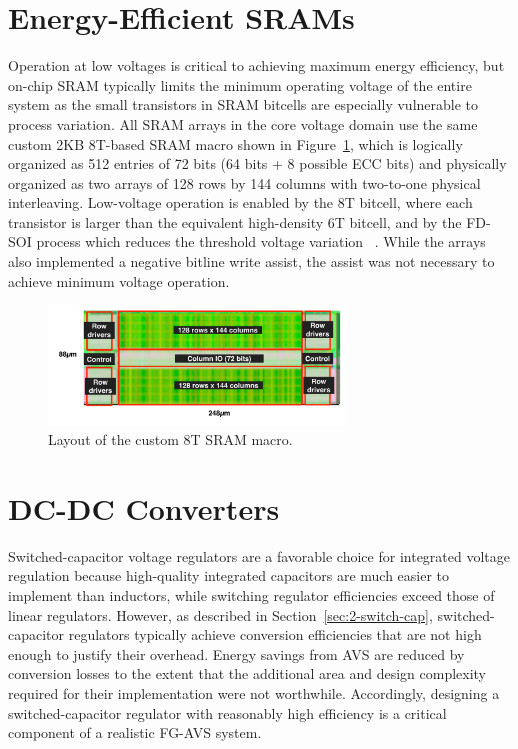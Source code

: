 \documentclass[graybox]{svmult}
\begin{document}
\section{Energy-Efficient SRAMs}

Operation at low voltages is critical to achieving maximum energy efficiency, but on-chip SRAM typically limits the minimum operating voltage of the entire system as the small transistors in SRAM bitcells are especially vulnerable to process variation.
All SRAM arrays in the core voltage domain use the same custom 2KB 8T-based SRAM macro shown in Figure~\ref{fig:sram}, which is logically organized as 512 entries of 72 bits (64 bits + 8 possible ECC bits) and physically organized as two arrays of 128 rows by 144 columns with two-to-one physical interleaving.
Low-voltage operation is enabled by the 8T bitcell, where each transistor is larger than the equivalent high-density 6T bitcell, and by the FD-SOI process which reduces the threshold voltage variation \cite{planes}~\cite{raven1}.
While the arrays also implemented a negative bitline write assist, the assist was not necessary to achieve minimum voltage operation.

\begin{figure}
  \centering
  \includegraphics[width=0.7\textwidth]{sram}
  \caption{Layout of the custom 8T SRAM macro.}
  \label{fig:sram}
\end{figure}


\section{DC-DC Converters}


Switched-capacitor voltage regulators are a favorable choice for integrated voltage regulation because high-quality integrated capacitors are much easier to implement than inductors, while switching regulator efficiencies exceed those of linear regulators.
However, as described in Section~\ref{sec:2-switch-cap}, switched-capacitor regulators typically achieve conversion efficiencies that are not high enough to justify their overhead. 
Energy savings from AVS are reduced by conversion losses to the extent that the additional area and design complexity required for their implementation were not worthwhile.
Accordingly, designing a switched-capacitor regulator with reasonably high efficiency is a critical component of a realistic FG-AVS system.
\end{document}
